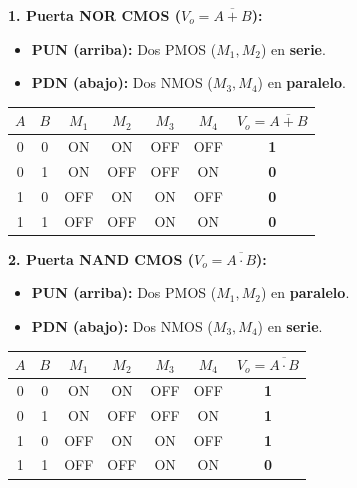 \begin{minipage}[t]{0.48\textwidth}
\textbf{1. Puerta NOR CMOS ($V_o = \overline{A + B}$):}
\begin{itemize}[leftmargin=*]
    \item \textbf{PUN (arriba):} Dos PMOS ($M_1, M_2$) en \textbf{serie}.
    \item \textbf{PDN (abajo):} Dos NMOS ($M_3, M_4$) en \textbf{paralelo}.
\end{itemize}
\begin{center}
\footnotesize
\renewcommand{\arraystretch}{1.15}
\begin{tabular}{cc|cccc|c}
\toprule
$A$ & $B$ & $M_1$ & $M_2$ & $M_3$ & $M_4$ & $V_o = \overline{A+B}$ \\
\midrule
0 & 0 & ON & ON & OFF & OFF & \textbf{1} \\
0 & 1 & ON & OFF & OFF & ON & \textbf{0} \\
1 & 0 & OFF & ON & ON & OFF & \textbf{0} \\
1 & 1 & OFF & OFF & ON & ON & \textbf{0} \\
\bottomrule
\end{tabular}
\end{center}
\end{minipage}
\hfill
\begin{minipage}[t]{0.48\textwidth}
\textbf{2. Puerta NAND CMOS ($V_o = \overline{A \cdot B}$):}
\begin{itemize}[leftmargin=*]
    \item \textbf{PUN (arriba):} Dos PMOS ($M_1, M_2$) en \textbf{paralelo}.
    \item \textbf{PDN (abajo):} Dos NMOS ($M_3, M_4$) en \textbf{serie}.
\end{itemize}
\begin{center}
\footnotesize
\renewcommand{\arraystretch}{1.15}
\begin{tabular}{cc|cccc|c}
\toprule
$A$ & $B$ & $M_1$ & $M_2$ & $M_3$ & $M_4$ & $V_o = \overline{A\cdot B}$ \\
\midrule
0 & 0 & ON & ON & OFF & OFF & \textbf{1} \\
0 & 1 & ON & OFF & OFF & ON & \textbf{1} \\
1 & 0 & OFF & ON & ON & OFF & \textbf{1} \\
1 & 1 & OFF & OFF & ON & ON & \textbf{0} \\
\bottomrule
\end{tabular}
\end{center}
\end{minipage}

